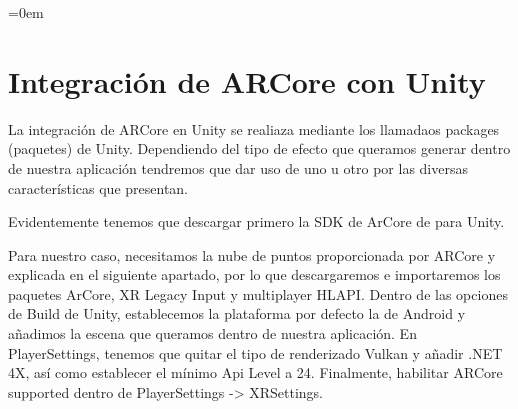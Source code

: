 \parindent=0em
\section{Integración de ARCore con Unity}
\noindent

La integración de ARCore en Unity se realiaza mediante los llamadaos packages (paquetes) de Unity. 
Dependiendo del tipo de efecto que queramos generar dentro de nuestra aplicación tendremos que dar uso de uno u otro por las diversas características que presentan.

Evidentemente tenemos que descargar primero la SDK de ArCore de para Unity.

Para nuestro caso, necesitamos la nube de puntos proporcionada por ARCore y explicada en el siguiente apartado, por lo que descargaremos e importaremos los paquetes ArCore, XR Legacy Input y multiplayer HLAPI. Dentro de las opciones de Build de Unity, establecemos la plataforma por defecto la de Android y añadimos la escena que queramos dentro de nuestra aplicación. En PlayerSettings, tenemos que quitar el tipo de renderizado Vulkan y añadir .NET 4X, así como establecer el mínimo Api Level a 24. Finalmente, habilitar ARCore supported dentro de PlayerSettings -> XRSettings.
